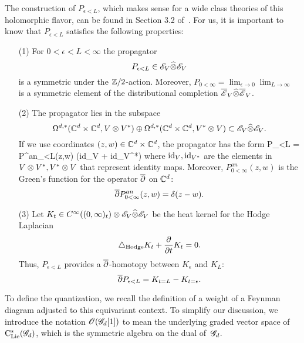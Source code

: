 The construction of $P_{\epsilon<L}$, which makes sense for a wide class theories of this holomorphic flavor, can be found in Section 3.2 of~\cite{BWhol}.
For us, it is important to know that $P_{\epsilon<L}$ satisfies the following properties:

\begin{enumerate}
\item[(1)] For $0 < \epsilon < L < \infty$ the propagator 
\[
P_{\epsilon < L} \in \mathscr E_V \widehat{\otimes} \mathscr E_V 
\]
is a symmetric under the $\mathbb Z/2$-action.
Moreover, $P_{0 < \infty} = \lim_{\epsilon \to 0}\lim_{L \to \infty}$ is a symmetric element of the distributional completion $\overline{\mathscr E}_V \widehat{\otimes} \overline{\mathscr E}_V$. 

\item[(2)] 
The propagator lies in the subspace
\[
\Omega^{d,*}(\mathbb C^d \times \mathbb C^d, V \otimes V^*) \oplus \Omega^{d,*}(\mathbb C^d \times \mathbb C^d, V^* \otimes V) \subset \mathscr E_V \widehat{\otimes} \mathscr E_V .
\]
If we use coordinates $(z,w) \in \mathbb C^d \times \mathbb C^d$, the propagator has the form
\beqn
P_{\epsilon<L} = P^{an}_{\epsilon<L}(z,w) \tensor \left({\rm id}_{V} + {\rm id}_{V^*}\right)
\eeqn
where ${\rm id}_V, {\rm id}_{V^*}$ are the elements in $V \otimes V^*, V^* \otimes V$ that represent identity maps. 
Moreover, $P^{an}_{0 < \infty} (z,w)$ is the Green's function for the operator $\overline{\partial}$ on $\mathbb C^d$:
\[
\overline{\partial} P^{an}_{0<\infty} (z,w) = \delta (z-w) .
\]

\item[(3)] Let $K_t \in C^\infty((0,\infty)_t) \otimes \mathscr E_V \widehat{\otimes} \mathscr E_V$ be the heat kernel for the Hodge Laplacian
\[
\triangle_{\rm Hodge} K_t + \frac{\partial}{\partial t} K_t = 0 .
\]
Thus, $P_{\epsilon < L}$ provides a $\overline{\partial}$-homotopy between $K_\epsilon$ and $K_L$:
\[
\overline{\partial} P_{\epsilon < L} = K_{t=L} - K_{t=\epsilon} .
\]
\end{enumerate}


To define the quantization, we recall the definition of a weight of a Feynman diagram adjusted to this equivariant context.
To simplify our discussion, we introduce the notation $\mathscr O(\mathscr G_d[1])$ to mean the underlying graded vector space of ${\rm C}_{{\rm Lie}}^*(\mathscr G_d)$, which is the  symmetric algebra on the dual of~$\mathscr G_d$. 

